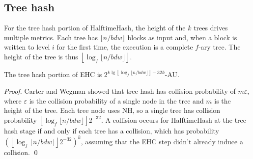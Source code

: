 \documentclass[runningheads]{llncs}
\begin{document}








\subsection{Tree hash}

For the tree hash portion of HalftimeHash, the height of the $k$ trees drives multiple metrics.
Each tree has $\lfloor n / b d w \rfloor$ blocks as input and, when a block is written to level $i$ for the first time, the execution is a complete $f$-ary tree.
The height of the tree is thus $\left\lfloor \log_f \lfloor n / b d w \rfloor \right\rfloor$.

\begin{lemma}
The tree hash portion of EHC is $2^{ k\lg\left\lfloor\log_f \lfloor n/b d w\rfloor\right\rfloor - 32k}$-AU.
\end{lemma}
\begin{proof}
  Carter and Wegman showed that tree hash has collision probability of $m \varepsilon$, where $\varepsilon$ is the collision probability of a single node in the tree and $m$ is the height of the tree.
  Each tree node uses NH, so a single tree has collision probability $\left\lfloor \log_f \lfloor n / b d w \rfloor \right\rfloor 2^{-32}$.
  A collision occurs for HalftimeHash at the tree hash stage if and only if each tree has a collision, which has probability $\left(\left\lfloor \log_f \lfloor n / b d w \rfloor \right\rfloor 2^{-32}\right)^k$, assuming that the EHC step didn't already induce a collision. \qed
\end{proof}

\end{document}
